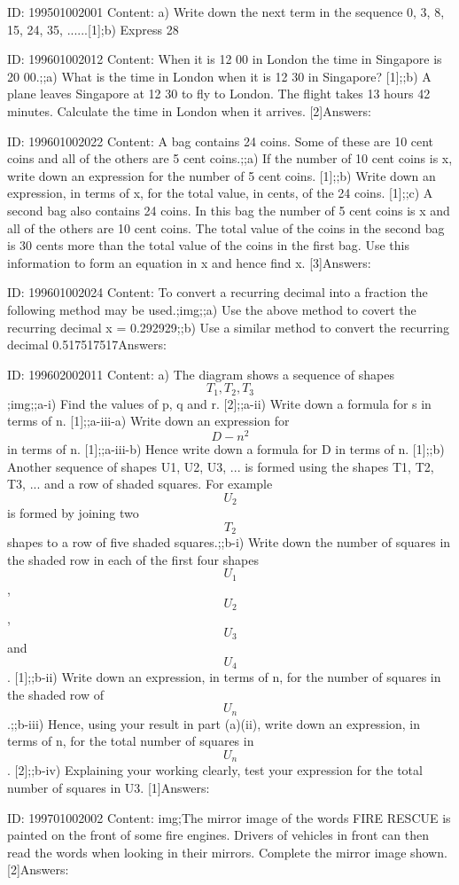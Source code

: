 \documentclass{article}
\begin{document}
ID: 199501002001
Content:
a) Write down the next term in the sequence 0, 3, 8, 15, 24, 35, ......[1];b) Express 28%

ID: 199601002012
Content:
When it is 12 00 in London the time in Singapore is 20 00.;;a) What is the time in London when it is 12 30 in Singapore? [1];;b) A plane leaves Singapore at 12 30 to fly to London. The flight takes 13 hours 42 minutes. Calculate the time in London when it arrives. [2]Answers:

ID: 199601002022
Content:
A bag contains 24 coins. Some of these are 10 cent coins and all of the others are 5 cent coins.;;a) If the number of 10 cent coins is x, write down an expression for the number of 5 cent coins. [1];;b) Write down an expression, in terms of x, for the total value, in cents, of the 24 coins. [1];;c) A second bag also contains 24 coins. In this bag the number of 5 cent coins is x and all of the others are 10 cent coins. The total value of the coins in the second bag is 30 cents more than the total value of the coins in the first bag. Use this information to form an equation in x and hence find x. [3]Answers:

ID: 199601002024
Content:
To convert a recurring decimal into a fraction the following method may be used.;img;;a) Use the above method to covert the recurring decimal x = 0.292929;;b) Use a similar method to convert the recurring decimal 0.517517517Answers:

ID: 199602002011
Content:
a) The diagram shows a sequence of shapes $$T_1, T_2, T_3$$;img;;a-i) Find the values of p, q and r. [2];;a-ii) Write down a formula for s in terms of n. [1];;a-iii-a) Write down an expression for $$D - n^2$$ in terms of n. [1];;a-iii-b) Hence write down a formula for D in terms of n. [1];;b) Another sequence of shapes U1, U2, U3, ... is formed using the shapes T1, T2, T3, ... and a row of shaded squares. For example $$U_2$$ is formed by joining two $$T_2$$ shapes to a row of five shaded squares.;;b-i) Write down the number of squares in the shaded row in each of the first four shapes $$U_1$$,$$U_2$$, $$U_3$$ and $$U_4$$. [1];;b-ii) Write down an expression, in terms of n, for the number of squares in the shaded row of $$U_n$$.;;b-iii) Hence, using your result in part (a)(ii), write down an expression, in terms of n, for the total number of squares in $$U_n$$. [2];;b-iv) Explaining your working clearly, test your expression for the total number of squares in U3. [1]Answers:

ID: 199701002002
Content:
img;The mirror image of the words FIRE RESCUE is painted on the front of some fire engines. Drivers of vehicles in front can then read the words when looking in their mirrors. Complete the mirror image shown. [2]Answers:
\end{document}
